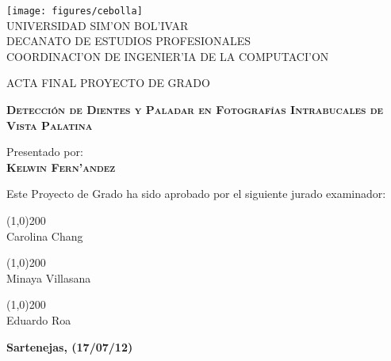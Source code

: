 \documentclass[oneside,12pt,letterpaper]{report}
\begin{document}
\begin{titlepage}
\begin{center}

\texttt{[image: figures/cebolla]} \\

\textsc {\large UNIVERSIDAD SIM'ON BOL'IVAR} \\
\textsc{DECANATO DE ESTUDIOS PROFESIONALES\\
COORDINACI'ON DE INGENIER'IA DE LA COMPUTACI'ON}

\bigskip
\bigskip
\bigskip
\bigskip
\bigskip
\bigskip

\textsc{ACTA FINAL PROYECTO DE GRADO}

\bigskip
\bigskip

\textsc{\bfseries Detección de Dientes y Paladar
en Fotografías Intrabucales de Vista Palatina}

\bigskip
\bigskip
\bigskip
\bigskip

\begin{minipage}{\textwidth}
\centering
Presentado por: \\
\textsc{\bfseries Kelwin Fern'andez} \\

\bigskip
\bigskip
\bigskip
\bigskip

Este Proyecto de Grado ha sido aprobado por el siguiente jurado examinador: \\

\bigskip
\bigskip

\line(1,0){200} \\
Carolina Chang\\

\bigskip
\bigskip

\line(1,0){200} \\
Minaya Villasana\\

\bigskip
\bigskip

\line(1,0){200} \\
Eduardo Roa\\
\end{minipage}

\bigskip
\bigskip
\vfill

{\large \bfseries Sartenejas, (17/07/12)}

\end{center}
\end{titlepage}
\end{document}
